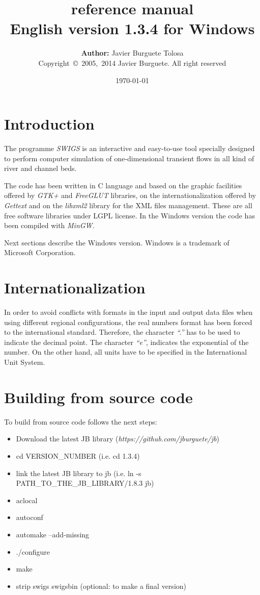 \documentclass[a4paper,12pt]{article}
\title
{
	{\bf\Large {\swigs} reference manual}\\
	{\large	English version 1.3.4 for Windows}
}
\author
{
	{\bf Author:} Javier Burguete Tolosa\\
	{\small Copyright~\copyright~2005,~2014 Javier Burguete.
	All right reserved}
}
\date{\today}
\newcommand{\swigs}{\emph{SWIGS}}
\newcommand{\IT}[1]{{\sl ``#1''}}
\begin{document}
\maketitle

\tableofcontents
\clearpage

\setlength{\parskip}{\baselineskip / 2}

\section{Introduction}

The programme {\swigs} is an interactive and easy-to-use tool specially designed
to perform computer simulation of one-dimensional transient flows in all kind of
river and channel beds. 

The code has been written in C language and based on the graphic facilities
offered by \emph{GTK+} and \emph{FreeGLUT} libraries, on the
internationalization offered by \emph{Gettext} and on the \emph{libxml2} library
for the XML files management. These are all free software libraries under LGPL
license. In the Windows version the code has been compiled with \emph{MinGW}.

Next sections describe the Windows version. Windows is a trademark of Microsoft
Corporation.

\section{Internationalization}

In order to avoid conflicts with formats in the input and output data files when
using different regional configurations, the real numbers format has been forced
to the international standard. Therefore, the character \IT{.} has to be used to
indicate the decimal point. The character \IT{e}, indicates the exponential of
the number. On the other hand, all units have to be specified in the
International Unit System. 

\section{Building from source code}

To build from source code follows the next steps:
\begin{itemize}
	\item Download the latest JB library
		(\emph{https://github.com/jburguete/jb})
	\item cd VERSION\_NUMBER (i.e. cd 1.3.4)
	\item link the latest JB library to jb (i.e. ln -s
		PATH\_TO\_THE\_JB\_LIBRARY/1.8.3 jb)
	\item aclocal
	\item autoconf
	\item automake --add-missing
	\item ./configure
	\item make
	\item strip swigs swigsbin (optional: to make a final version)
\end{itemize}
\end{document}
